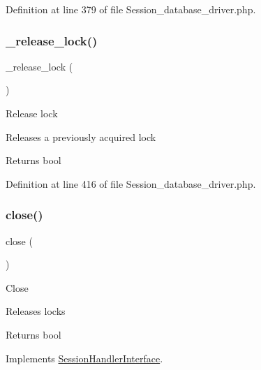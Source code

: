 Definition at line 379 of file Session\+\_\+database\+\_\+driver.\+php.

\mbox{\label{class_c_i___session__database__driver_a0265e356e6cf1eaba229663c1664c37d}} 
\subsubsection{\texorpdfstring{\_release\_lock()}{\_release\_lock()}}
{\footnotesize\ttfamily \+\_\+release\+\_\+lock (\begin{DoxyParamCaption}{ }\end{DoxyParamCaption})\hspace{0.3cm}{\ttfamily [protected]}}

Release lock

Releases a previously acquired lock

\begin{DoxyReturn}{Returns}
bool 
\end{DoxyReturn}


Definition at line 416 of file Session\+\_\+database\+\_\+driver.\+php.

\mbox{\label{class_c_i___session__database__driver_aa69c8bf1f1dcf4e72552efff1fe3e87e}} 
\subsubsection{\texorpdfstring{close()}{close()}}
{\footnotesize\ttfamily close (\begin{DoxyParamCaption}{ }\end{DoxyParamCaption})}

Close

Releases locks

\begin{DoxyReturn}{Returns}
bool 
\end{DoxyReturn}


Implements \mbox{\hyperlink{interface_session_handler_interface_aa69c8bf1f1dcf4e72552efff1fe3e87e}{Session\+Handler\+Interface}}.



